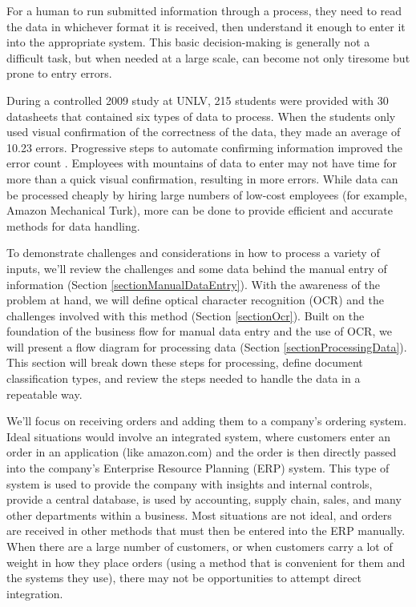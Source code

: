 \documentclass[conference, draftcls]{IEEEtran}
\begin{document}
For a human to run submitted information through a process, they need to read the data in whichever format it is received, then understand it enough to enter it into the appropriate system. This basic decision-making is generally not a difficult task, but when needed at a large scale, can become not only tiresome but prone to entry errors. 

During a controlled 2009 study at UNLV, 215 students were provided with 30 datasheets that contained six types of data to process. When the students only used visual confirmation of the correctness of the data, they made an average of 10.23 errors. Progressive steps to automate confirming information improved the error count \cite{harris2014when}. Employees with mountains of data to enter may not have time for more than a quick visual confirmation, resulting in more errors. While data can be processed cheaply by hiring large numbers of low-cost employees (for example, Amazon Mechanical Turk), more can be done to provide efficient and accurate methods for data handling.

To demonstrate challenges and considerations in how to process a variety of inputs, we'll review the challenges and some data behind the manual entry of information (Section \ref{sectionManualDataEntry}). With the awareness of the problem at hand, we will define optical character recognition (OCR) and the challenges involved with this method (Section \ref{sectionOcr}). Built on the foundation of the business flow for manual data entry and the use of OCR, we will present a flow diagram for processing data (Section \ref{sectionProcessingData}). This section will break down these steps for processing, define document classification types, and review the steps needed to handle the data in a repeatable way.

We'll focus on receiving orders and adding them to a company's ordering system. Ideal situations would involve an integrated system, where customers enter an order in an application (like amazon.com) and the order is then directly passed into the company's Enterprise Resource Planning (ERP) system. This type of system is used to provide the company with insights and internal controls, provide a central database, is used by accounting, supply chain, sales, and many other departments within a business. Most situations are not ideal, and orders are received in other methods that must then be entered into the ERP manually. When there are a large number of customers, or when customers carry a lot of weight in how they place orders (using a method that is convenient for them and the systems they use), there may not be opportunities to attempt direct integration.
\end{document}
